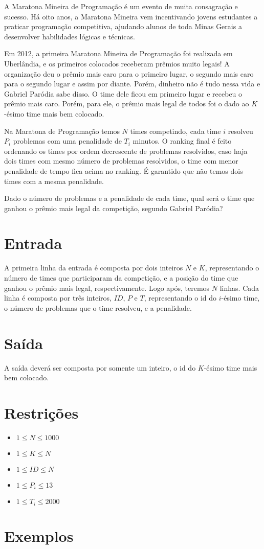 %

A Maratona Mineira de Programação é um evento de muita consagração e sucesso. Há oito anos, a Maratona Mineira vem incentivando jovens estudantes a praticar programação competitiva, ajudando alunos de toda Minas Gerais a desenvolver habilidades lógicas e técnicas.

Em 2012, a primeira Maratona Mineira de Programação foi realizada em Uberlândia, e os primeiros colocados receberam prêmios muito legais! A organização deu o prêmio mais caro para o primeiro lugar, o segundo mais caro para o segundo lugar e assim por diante. Porém, dinheiro não é tudo nessa vida e Gabriel Paródia sabe disso. O time dele ficou em primeiro lugar e recebeu o prêmio mais caro. Porém, para ele, o prêmio mais legal de todos foi o dado ao $K$-ésimo time mais bem colocado.

Na Maratona de Programação temos $N$ times competindo, cada time $i$ resolveu $P_i$ problemas com uma penalidade de $T_i$ minutos. O ranking final é feito ordenando os times por ordem decrescente de problemas resolvidos, caso haja dois times com mesmo número de problemas resolvidos, o time com menor penalidade de tempo fica acima no ranking. É garantido que não temos dois times com a mesma penalidade.

Dado o número de problemas e a penalidade de cada time, qual será o time que ganhou o prêmio mais legal da competição, segundo Gabriel Paródia?


\section*{Entrada}
A primeira linha da entrada é composta por dois inteiros $N$ e $K$, representando o número de times que participaram da competição, e a posição do time que ganhou o prêmio mais legal, respectivamente. Logo após, teremos $N$ linhas. Cada linha é composta por três inteiros, $ID$, $P$ e $T$, representando o id do $i$-ésimo time, o número de problemas que o time resolveu, e a penalidade.


\section*{Saída}
A saída deverá ser composta por somente um inteiro, o id do $K$-ésimo time mais bem colocado.


\section*{Restrições}

\begin{itemize}
\item $1 \leq N \leq 1000$
\item $1 \leq K \leq N$
\item $1 \leq ID \leq N$
\item $1 \leq P_i \leq 13$
\item $1 \leq T_i \leq 2000$
\end{itemize}


\section*{Exemplos}

\exemplo
